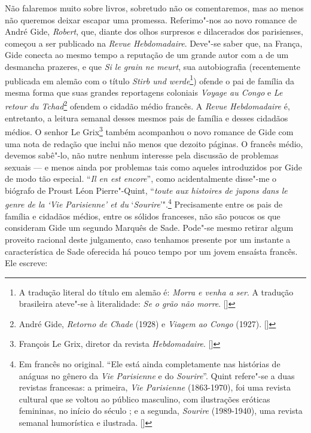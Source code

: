 Não falaremos muito sobre livros, sobretudo não os comentaremos, mas ao
menos não queremos deixar escapar uma promessa. Referimo"-nos ao novo
romance de André Gide, \emph{Robert}, que, diante dos olhos surpresos e
dilacerados dos parisienses, começou a ser publicado na \emph{Revue
Hebdomadaire}. Deve"-se saber que, na França, Gide conecta ao mesmo tempo
a reputação de um grande autor com a de um desmancha prazeres, e que
\emph{Si le grain ne meurt}, sua autobiografia (recentemente publicada
em alemão com o título \emph{Stirb und werde}\footnote{A tradução
  literal do título em alemão é: \emph{Morra e venha a ser}. A tradução
  brasileira ateve"-se à literalidade: \emph{Se o grão não morre}. []})
ofende o pai de família da mesma forma que suas grandes reportagens
coloniais \emph{Voyage au Congo} e \emph{Le retour du Tchad}\footnote{André Gide, \emph{Retorno de Chade} (1928) e \emph{Viagem ao Congo} (1927). []} ofendem
o cidadão médio francês. A \emph{Revue Hebdomadaire} é, entretanto, a
leitura semanal desses mesmos pais de família e desses cidadãos médios. O
senhor Le Grix\footnote{‎François Le Grix, diretor da revista
  \emph{Hebdomadaire}. []} também acompanhou o novo romance de Gide com uma
nota de redação que inclui não menos que dezoito páginas. O francês
médio, devemos sabê"-lo, não nutre nenhum interesse pela discussão de
problemas sexuais --- e menos ainda por problemas tais como aqueles
introduzidos por Gide de modo tão especial. ``\emph{Il en est encore}'',
como acidentalmente disse"-me o biógrafo de Proust Léon Pierre"-Quint,
``\emph{toute aux histoires de jupons dans le genre de la} \emph{`Vie
Parisienne' et du} `\emph{Sourire}'".\footnote{Em francês no
  original. ``Ele está ainda completamente nas histórias de anáguas no
  gênero da \emph{Vie Parisienne} e do \emph{Sourire}''. Quint refere"-se a duas
  revistas francesas: a primeira, \emph{Vie Parisienne}
  (1863-1970), foi uma revista cultural que se voltou ao público
  masculino, com ilustrações eróticas femininas, no início do século ;
  e a segunda, \emph{Sourire} (1989-1940), uma revista semanal
  humorística e ilustrada. []} Precisamente entre os pais de família e
cidadãos médios, entre os sólidos franceses, não são poucos os que
consideram Gide um segundo Marquês de Sade. Pode"-se mesmo retirar algum
proveito racional deste julgamento, caso tenhamos presente por um
instante a característica de Sade oferecida há pouco tempo por um jovem
ensaísta francês. Ele escreve:

